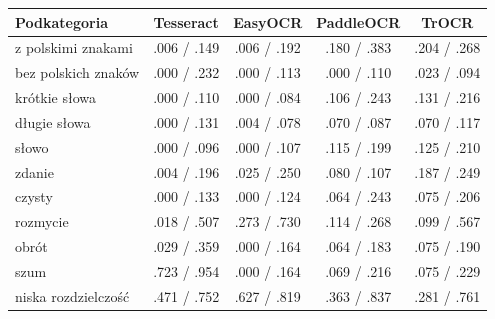 \begin{tabular}{lcccc}
\toprule
Podkategoria & Tesseract & EasyOCR & PaddleOCR & TrOCR \\
\midrule
z polskimi znakami & .006 / .149 & .006 / .192 & .180 / .383 & .204 / .268 \\
bez polskich znaków & .000 / .232 & .000 / .113 & .000 / .110 & .023 / .094 \\
\midrule
krótkie słowa & .000 / .110 & .000 / .084 & .106 / .243 & .131 / .216 \\
długie słowa & .000 / .131 & .004 / .078 & .070 / .087 & .070 / .117 \\
\midrule
słowo & .000 / .096 & .000 / .107 & .115 / .199 & .125 / .210 \\
zdanie & .004 / .196 & .025 / .250 & .080 / .107 & .187 / .249 \\
\midrule
czysty & .000 / .133 & .000 / .124 & .064 / .243 & .075 / .206 \\
rozmycie & .018 / .507 & .273 / .730 & .114 / .268 & .099 / .567 \\
obrót & .029 / .359 & .000 / .164 & .064 / .183 & .075 / .190 \\
szum & .723 / .954 & .000 / .164 & .069 / .216 & .075 / .229 \\
niska rozdzielczość & .471 / .752 & .627 / .819 & .363 / .837 & .281 / .761 \\
\bottomrule
\end{tabular}
